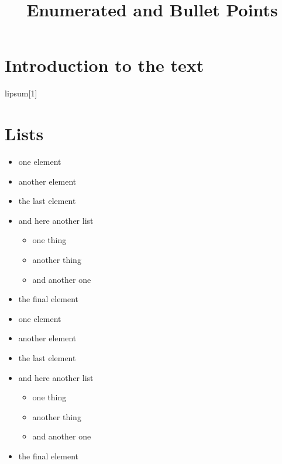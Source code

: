 \documentclass[12pt, twoside]{article}
\title{Enumerated and Bullet Points}
\begin{document}
\maketitle

\begin{abstract}
	\lipsum[1]
\end{abstract}

\section{Introduction to the text}

lipsum[1]

\section{Lists}

\begin{itemize}[label = {+}]
	\item one element
	\item another element
	\item the last element
	\item and here another list
	\begin{itemize}
		\item one thing
		\item another thing
		\item and another one
	\end{itemize}
	\item the final element
\end{itemize}

\clearpage

\begin{itemize}[label = {+}]
	\item one element
	\item another element
	\item the last element
	\item and here another list
	\begin{itemize}
		\item one thing
		\item another thing
		\item and another one
	\end{itemize}
	\item the final element
\end{itemize}

\clearpage
\end{document}

